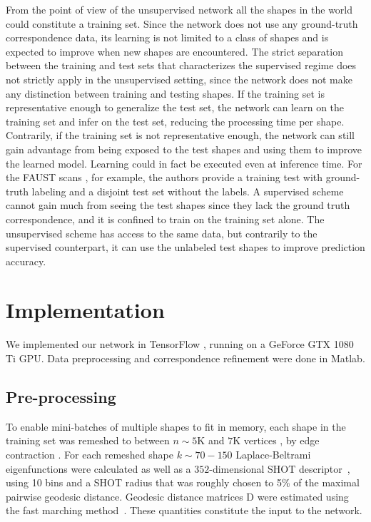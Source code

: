 \documentclass[10pt,twocolumn,letterpaper]{article}
\newcommand\comment[1]{{}}
\newcommand{\bb}[1]{\bm{\mathrm{#1}}}
\begin{document}
From the point of view of the unsupervised network all the shapes in the world could constitute a training set. 
Since the network does not use any ground-truth correspondence data, its learning is not limited to a class of shapes and is expected to improve when new shapes are encountered. 
The strict separation between the training and test sets that characterizes the supervised regime does not strictly apply in the unsupervised setting, since the network does not make any distinction between training and testing shapes. 
If the training set is representative enough to generalize the test set, the network can learn on the training set and infer on the test set, reducing the processing time per shape. 
Contrarily, if the training set is not representative enough, the network can still gain advantage from being exposed to the test shapes and using them to improve the learned model.
Learning could in fact be executed even at inference time. 
For the FAUST scans \cite{faust}, for example, the authors provide a training test with ground-truth labeling and a disjoint test set without the labels. 
A supervised scheme cannot gain much %
from seeing the test shapes since they lack the ground truth correspondence, and it is confined to train on the training set alone. 
The unsupervised scheme has access to the same data, but contrarily to the supervised counterpart, it can use the unlabeled test shapes to improve prediction accuracy. 
\comment{Due to this reason, for the FAUST benchmark we report two scores, the first one following the traditional supervised setting, in which separation is made to training and test sets, and only the training set is used for training. 
Additionally, we report a second score achieved by injecting a subset of the test set to the training process. 
The injected shapes are not included in the specific test challenge pairs list. 
We show that by encountering additional unsupervised data the network can improve its prediction. }

\section{Implementation}
We implemented our network in TensorFlow \cite{tensorflow2015-whitepaper}, running on a GeForce GTX 1080 Ti GPU. Data preprocessing and correspondence refinement were done in Matlab. 
\subsection{Pre-processing}
To enable mini-batches of multiple shapes to fit in memory, each shape in the
training set was remeshed to between $n \sim 5$K and $7$K vertices , by edge contraction \cite{garland1997surface}. For each remeshed shape $k \sim 70 - 150$ Laplace-Beltrami eigenfunctions were calculated as well as a $352$-dimensional SHOT descriptor~\cite{salti2014shot}, using 10 bins and a SHOT radius that was roughly chosen to 5\% of the maximal pairwise geodesic distance. Geodesic distance matrices $\bb{D}$ were estimated using the fast marching method~\cite{kimmel1998computing}. These quantities constitute the input to the network.
\end{document}
